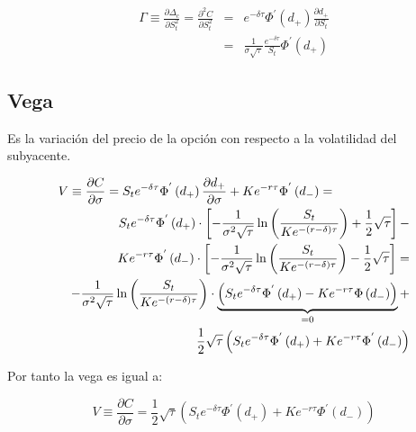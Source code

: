 \documentclass[12pt]{article}
\begin{document}
\begin{eqnarray}
	\Gamma \equiv \frac{\partial \Delta_{c}}{\partial S_{t}^{2}} = \frac{\partial^{2}C}{\partial S_{t}^{2}} & = & 
	e^{-\delta\tau}\Phi^{'}\left(d_{+}\right)\frac{\partial d_{+}}{\partial S_{t}} \nonumber \\
	& = & \frac{1}{\sigma\sqrt{\tau}}\frac{e^{-\delta\tau}}{S_{t}}\Phi^{'}\left(d_{+}\right)
\end{eqnarray}
\newline

\subsection{Vega}
Es la variaci\'{o}n del precio de la opci\'{o}n con respecto a la volatilidad del subyacente.
\newline

\begin{eqnarray*}
	\lefteqn{V \equiv \frac{\partial C}{\partial \sigma} = S_{t}e^{-\delta\tau}\Phi^{'}\left(d_{+}\right)
	\frac{\partial d_{+}}{\partial \sigma} + Ke^{-r\tau}\Phi^{'}\left(d_{-}\right) = } \\
	 & & S_{t}e^{-\delta\tau}\Phi^{'}\left(d_{+}\right)\cdot\left[-\frac{1}{\sigma^{2}\sqrt{\tau}}\ln\left(\frac{S_{t}}
	{Ke^{-\left(r-\delta\right)\tau}}\right)+\frac{1}{2}\sqrt{\tau}\right] -  \\
	 & & Ke^{-r\tau}\Phi^{'}\left(d_{-}\right)\cdot\left[-\frac{1}{\sigma^{2}\sqrt{\tau}}\ln\left(\frac{S_{t}}
	{Ke^{-\left(r-\delta\right)\tau}}\right)-\frac{1}{2}\sqrt{\tau}\right] = \\
	 & & -\frac{1}{\sigma^{2}\sqrt{\tau}}\ln\left(\frac{S_{t}}{Ke^{-\left(r-\delta\right)\tau}}\right)\cdot
	\underbrace{\left(S_{t}e^{-\delta\tau}\Phi^{'}\left(d_{+}\right)-Ke^{-r\tau}\Phi\left(d_{-}\right)\right)}_{=0} + \\
	 & & \frac{1}{2}\sqrt{\tau}\left(S_{t}e^{-\delta\tau}\Phi^{'}\left(d_{+}\right) + 
	Ke^{-r\tau}\Phi^{'}\left(d_{-}\right)\right)
\end{eqnarray*}
\newline

Por tanto la vega es igual a:
\newline

\begin{equation}
	 V \equiv \frac{\partial C}{\partial\sigma} = \frac{1}{2}\sqrt{\tau}\left(S_{t}e^{-\delta\tau}\Phi^{'}\left(d_{+}\right)+
		Ke^{-r\tau}\Phi^{'}\left(d_{-}\right)\right)
\end{equation}
\newline
\end{document}
